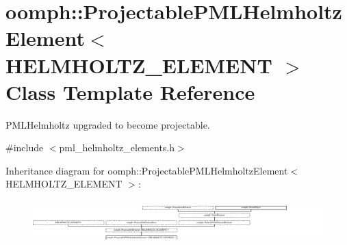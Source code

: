 \hypertarget{classoomph_1_1ProjectablePMLHelmholtzElement}{}\section{oomph\+:\+:Projectable\+P\+M\+L\+Helmholtz\+Element$<$ H\+E\+L\+M\+H\+O\+L\+T\+Z\+\_\+\+E\+L\+E\+M\+E\+NT $>$ Class Template Reference}
\label{classoomph_1_1ProjectablePMLHelmholtzElement}


P\+M\+L\+Helmholtz upgraded to become projectable.  




{\ttfamily \#include $<$pml\+\_\+helmholtz\+\_\+elements.\+h$>$}

Inheritance diagram for oomph\+:\+:Projectable\+P\+M\+L\+Helmholtz\+Element$<$ H\+E\+L\+M\+H\+O\+L\+T\+Z\+\_\+\+E\+L\+E\+M\+E\+NT $>$\+:\begin{figure}[H]
\begin{center}
\leavevmode
\includegraphics[height=1.678657cm]{classoomph_1_1ProjectablePMLHelmholtzElement}
\end{center}
\end{figure}
